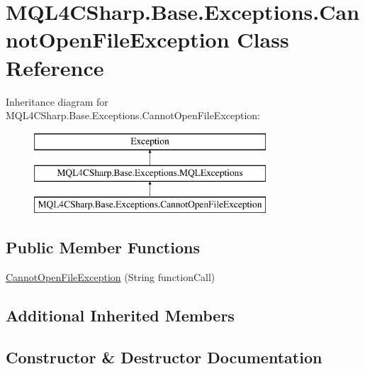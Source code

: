 \hypertarget{class_m_q_l4_c_sharp_1_1_base_1_1_exceptions_1_1_cannot_open_file_exception}{}\section{M\+Q\+L4\+C\+Sharp.\+Base.\+Exceptions.\+Cannot\+Open\+File\+Exception Class Reference}
\label{class_m_q_l4_c_sharp_1_1_base_1_1_exceptions_1_1_cannot_open_file_exception}
Inheritance diagram for M\+Q\+L4\+C\+Sharp.\+Base.\+Exceptions.\+Cannot\+Open\+File\+Exception\+:\begin{figure}[H]
\begin{center}
\leavevmode
\includegraphics[height=3.000000cm]{class_m_q_l4_c_sharp_1_1_base_1_1_exceptions_1_1_cannot_open_file_exception}
\end{center}
\end{figure}
\subsection*{Public Member Functions}
\begin{DoxyCompactItemize}
\item 
\hyperlink{class_m_q_l4_c_sharp_1_1_base_1_1_exceptions_1_1_cannot_open_file_exception_ae0deb7bed7d404fa1c5a20a91f87dd92}{Cannot\+Open\+File\+Exception} (String function\+Call)
\end{DoxyCompactItemize}
\subsection*{Additional Inherited Members}


\subsection{Constructor \& Destructor Documentation}
